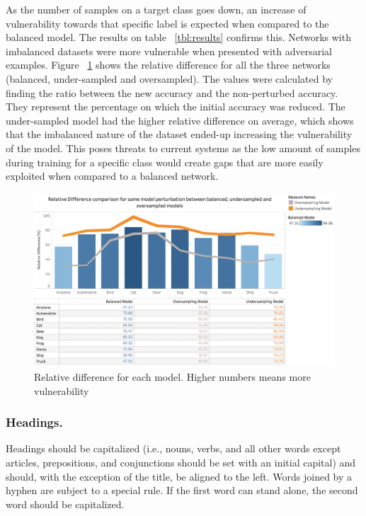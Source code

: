 \documentclass[runningheads,a4paper]{llncs}
\begin{document}
As the number of samples on a target class goes down, an increase of vulnerability towards that specific label is expected when compared to the balanced model. The results on table  ~\ref{tbl:results} confirms this. Networks with imbalanced datasets were more vulnerable when presented with adversarial examples. Figure ~\ref{fig:relative_difference} shows the relative difference for all the three networks (balanced, under-sampled and oversampled).  The values were calculated by finding the ratio between the new accuracy and the non-perturbed accuracy. They represent the percentage on which the initial accuracy was reduced. The under-sampled model had the higher relative difference on average, which shows that the imbalanced nature of the dataset ended-up increasing the vulnerability of the model. This poses threats to current systems as the low amount of samples during training for a specific class would  create gaps that are more easily exploited when compared to a balanced network.

\begin{figure}[H]
	\centering
	\includegraphics[height=6.5cm]{rel_diff_graph.png}
	\caption{Relative difference for each model. Higher numbers means more vulnerability}
	\label{fig:relative_difference}
\end{figure}

\subsubsection{Headings.}

Headings should be capitalized
(i.e., nouns, verbs, and all other words
except articles, prepositions, and conjunctions should be set with an
initial capital) and should,
with the exception of the title, be aligned to the left.
Words joined by a hyphen are subject to a special rule. If the first
word can stand alone, the second word should be capitalized.
\end{document}
